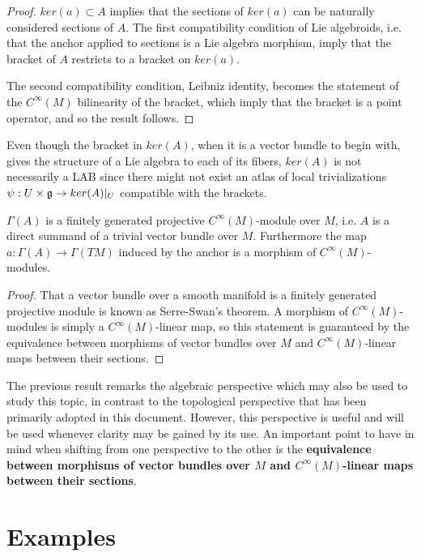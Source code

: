 \begin{proof}
$ker(a) \subset A$ implies that the sections of $ker(a)$ can be naturally considered sections of $A$. The first compatibility condition of Lie algebroids, i.e. that the anchor applied to sections is a Lie algebra morphism, imply that the bracket of $A$ restricts to a bracket on $ker(a)$.

The second compatibility condition, Leibniz identity, becomes the statement of the $C^\infty(M)$ bilinearity of the bracket, which imply that the bracket is a point operator, and so the result follows.
\end{proof}

\begin{remark}
Even though the bracket in $ker(A)$, when it is a vector bundle to begin with, gives the structure of a Lie algebra to each of its fibers, $ker(A)$ is not necessarily a LAB since there might not exist an atlas of local trivializations $\psi: U \times \mathfrak{g} \to ker(A)|_U$ compatible with the brackets.
\end{remark}

\linea 

\begin{proposition}
$\Gamma(A)$ is a finitely generated projective $C^\infty(M)$-module over $M$, i.e. $A$ is a direct summand of a trivial vector bundle over $M$. Furthermore the map $a: \Gamma(A) \to \Gamma(TM)$ induced by the anchor is a morphism of $C^\infty(M)$-modules.
\end{proposition}
\begin{proof}
That a vector bundle over a smooth manifold is a finitely generated projective module is known as Serre-Swan's theorem. A morphism of $C^\infty(M)$-modules is simply a $C^\infty(M)$-linear map, so this statement is guaranteed by the equivalence between morphisms of vector bundles over $M$ and $C^\infty(M)$-linear maps between their sections.
\end{proof}

The previous result remarks the algebraic perspective which may also be used to study this topic, in contrast to the topological perspective that has been primarily adopted in this document. However, this perspective is useful and will be used whenever clarity may be gained by its use. An important point to have in mind when shifting from one perspective to the other is the \textbf{equivalence between morphisms of vector bundles over $M$ and $C^\infty(M)$-linear maps between their sections}.

\section{Examples}

